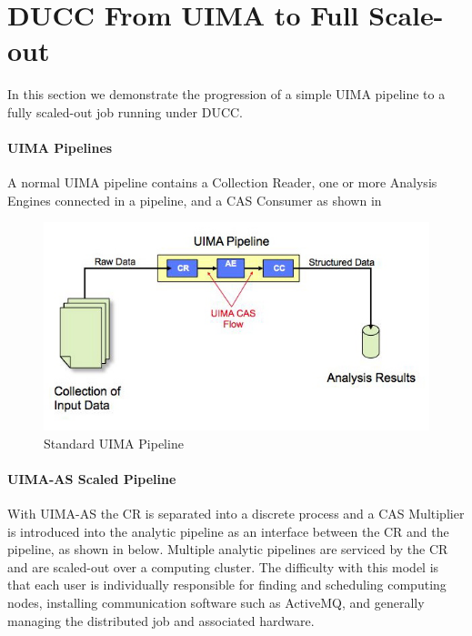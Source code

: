     \section{DUCC From UIMA to Full Scale-out}

    In this section we demonstrate the progression of a simple UIMA pipeline to a fully
    scaled-out job running under DUCC.

    \paragraph{UIMA Pipelines}
    A normal UIMA pipeline
    contains a Collection Reader, one or more Analysis Engines connected in a pipeline, and a CAS
    Consumer as shown in 

    \begin{figure}[H]
      \centering
      \includegraphics[bb=0 0 575 310, width=5.5in]{images/uima-pipeline.jpg}
      \caption{Standard UIMA Pipeline}
      \label{fig:UIMA-pipeline}
    \end{figure}

    \paragraph{UIMA-AS  Scaled Pipeline}
    With UIMA-AS the CR is separated into a discrete process and a CAS Multiplier is introduced 
    into the analytic pipeline as an interface between the CR and the pipeline, as shown in
     below.
    Multiple analytic pipelines are serviced by the 
    CR and are scaled-out over a computing cluster.  The difficulty with this model is that each
    user is individually responsible for finding and scheduling computing nodes, installing
    communication software such as ActiveMQ, and generally managing the distributed job and
    associated hardware.

